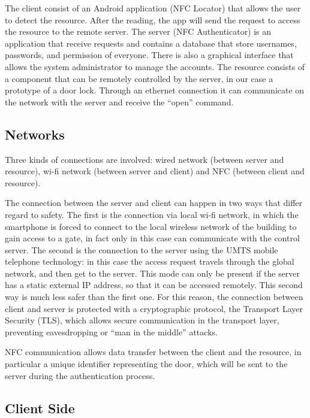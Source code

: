\documentclass[conference]{IEEEtran}
\begin{document}
The client consist of an Android application (NFC Locator) that allows the user to detect the resource. After the reading, the app will send the request to access the resource to the remote server.
The server (NFC Authenticator) is an application that receive requests and contains a database that store usernames, passwords, and permission of everyone.  There is also a graphical interface that allows the system administrator to manage the accounts.
The resource consists of a component that can be remotely controlled by the server, in our case a prototype of a door lock. Through an ethernet connection it can communicate on the network with the server and receive the “open” command.

\subsection{Networks}

Three kinds of connections are involved: wired network (between server and resource), wi-fi network (between server and client) and NFC (between client and resource).

The connection between the server and client can happen in two ways that differ regard to safety. The first is the connection via local wi-fi network, in which the smartphone is forced to connect to the local wireless network of the building to gain access to a gate, in fact only in this case can communicate with the control server. The second is the connection to the server using the UMTS mobile telephone technology: in this case the access request travels through the global network, and then get to the server. This mode can only be present if the server has a static external IP address, so that it can be accessed remotely. This second way is much less safer than the first one. For this reason, the connection between client and server is protected with a cryptographic protocol, the Transport Layer Security (TLS), which allows secure communication in the transport layer, preventing eavesdropping or “man in the middle” attacks. 

NFC communication allows data transfer between the client and the resource, in particular a unique identifier representing the door, which will be sent to the server during the authentication process.

\subsection{Client Side}
\end{document}
